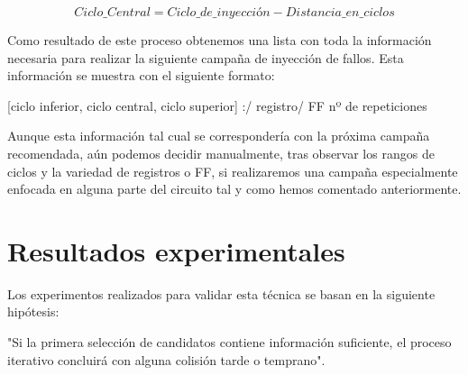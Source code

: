 \begin{equation}
    \label{eq:CicloCentral}
    Ciclo\_Central = Ciclo\_de\_inyección - Distancia\_en\_ciclos
\end{equation}

Como resultado de este proceso obtenemos una lista con toda la información
necesaria para realizar la siguiente campaña de inyección de fallos. Esta
información se muestra con el siguiente formato:
\begin{center}
    [ciclo inferior, ciclo central, ciclo superior] \hfill :/ \hfill registro/
    \hfill \gls{FF} \hfill nº de repeticiones
\end{center}

Aunque esta
información tal cual se correspondería con la próxima campaña recomendada, aún
podemos decidir manualmente, tras observar los rangos de ciclos y la variedad de
registros o \gls{FF}, si realizaremos una campaña especialmente enfocada en alguna
parte del circuito tal y como hemos comentado anteriormente.


\section{Resultados experimentales}
\label{sec:IterResults}
Los experimentos realizados para validar esta técnica se basan en la siguiente
hipótesis:

\begin{hypothesis}\label{hyp:ResIter}
    "Si la primera selección de candidatos contiene información suficiente, el
    proceso iterativo concluirá con alguna colisión tarde o temprano".
\end{hypothesis}






\endinput
